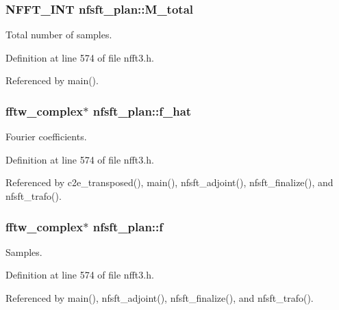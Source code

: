 \hypertarget{structnfsft__plan_a59e169c57df4a7e0aa1261293181bf49}{
\subsubsection[{M\-\_\-total}]{\setlength{\rightskip}{0pt plus 5cm}N\-F\-F\-T\-\_\-\-I\-N\-T nfsft\-\_\-plan\-::\-M\-\_\-total}}\label{structnfsft__plan_a59e169c57df4a7e0aa1261293181bf49}


Total number of samples. 



Definition at line 574 of file nfft3.\-h.



Referenced by main().

\hypertarget{structnfsft__plan_af3f147694cf5d7ac7b658288bf2cfb42}{
\subsubsection[{f\-\_\-hat}]{\setlength{\rightskip}{0pt plus 5cm}fftw\-\_\-complex$\ast$ nfsft\-\_\-plan\-::f\-\_\-hat}}\label{structnfsft__plan_af3f147694cf5d7ac7b658288bf2cfb42}


Fourier coefficients. 



Definition at line 574 of file nfft3.\-h.



Referenced by c2e\-\_\-transposed(), main(), nfsft\-\_\-adjoint(), nfsft\-\_\-finalize(), and nfsft\-\_\-trafo().

\hypertarget{structnfsft__plan_aebedb76f2df25603c548ae9672e970df}{
\subsubsection[{f}]{\setlength{\rightskip}{0pt plus 5cm}fftw\-\_\-complex$\ast$ nfsft\-\_\-plan\-::f}}\label{structnfsft__plan_aebedb76f2df25603c548ae9672e970df}


Samples. 



Definition at line 574 of file nfft3.\-h.



Referenced by main(), nfsft\-\_\-adjoint(), nfsft\-\_\-finalize(), and nfsft\-\_\-trafo().

